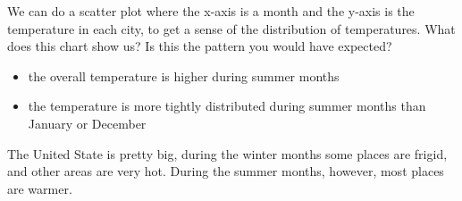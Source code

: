 \documentclass[
]{book}
\newenvironment{Shaded}{\begin{snugshade}}{\end{snugshade}}
\newcommand{\CommentTok}[1]{\textcolor[rgb]{0.56,0.35,0.01}{\textit{#1}}}
\newcommand{\DataTypeTok}[1]{\textcolor[rgb]{0.13,0.29,0.53}{#1}}
\newcommand{\DecValTok}[1]{\textcolor[rgb]{0.00,0.00,0.81}{#1}}
\newcommand{\FloatTok}[1]{\textcolor[rgb]{0.00,0.00,0.81}{#1}}
\newcommand{\KeywordTok}[1]{\textcolor[rgb]{0.13,0.29,0.53}{\textbf{#1}}}
\newcommand{\NormalTok}[1]{#1}
\newcommand{\OperatorTok}[1]{\textcolor[rgb]{0.81,0.36,0.00}{\textbf{#1}}}
\newcommand{\StringTok}[1]{\textcolor[rgb]{0.31,0.60,0.02}{#1}}
\providecommand{\tightlist}{%
  \setlength{\itemsep}{0pt}\setlength{\parskip}{0pt}}
\begin{document}
We can do a scatter plot where the x-axis is a month and the y-axis is the temperature in each city, to get a sense of the distribution of temperatures. What does this chart show us? Is this the pattern you would have expected?

\begin{itemize}
\tightlist
\item
  the overall temperature is higher during summer months
\item
  the temperature is more tightly distributed during summer months than January or December
\end{itemize}

The United State is pretty big, during the winter months some places are frigid, and other areas are very hot. During the summer months, however, most places are warmer.

\begin{Shaded}
\end{Shaded}
\end{document}
